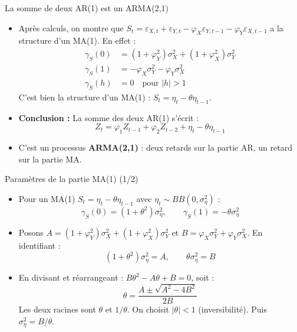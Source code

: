 \documentclass[11pt,aspectratio=169]{beamer}
\begin{document}
\begin{frame}{La somme de deux AR(1) est un ARMA(2,1)}

\begin{itemize}

\item Après calculs, on montre que $S_t = \varepsilon_{X,t} + \varepsilon_{Y,t} - \varphi_X \varepsilon_{Y,t-1} - \varphi_Y \varepsilon_{X,t-1}$ a la structure d'un MA(1). En effet :
  \begin{align*}
  \gamma_S(0) &= (1 + \varphi_Y^2) \sigma_X^2 + (1 + \varphi_X^2) \sigma_Y^2 \\
  \gamma_S(1) &= -\varphi_X \sigma_Y^2 - \varphi_Y \sigma_X^2 \\
  \gamma_S(h) &= 0 \quad \text{pour } |h| > 1
  \end{align*}
  C'est bien la structure d'un MA(1) : $S_t = \eta_t - \theta \eta_{t-1}$.\newline

\item \textbf{Conclusion :} La somme des deux AR(1) s'écrit :
\[
Z_t = \varphi_1 Z_{t-1} + \varphi_2 Z_{t-2} + \eta_t - \theta \eta_{t-1}
\]

\item C'est un processus \textbf{ARMA(2,1)} : deux retards sur la partie AR, un retard sur la partie MA.

\end{itemize}
\end{frame}

\begin{frame}{Paramètres de la partie MA(1) (1/2)}

\begin{itemize}

\item Pour un MA(1) $S_t = \eta_t - \theta \eta_{t-1}$ avec $\eta_t \sim BB(0, \sigma_\eta^2)$ :
  \[
  \gamma_S(0) = (1+\theta^2)\sigma_\eta^2, \qquad \gamma_S(1) = -\theta \sigma_\eta^2
  \]\newline

\item Posons $A = (1+\varphi_Y^2)\sigma_X^2 + (1+\varphi_X^2)\sigma_Y^2$ et $B = \varphi_X \sigma_Y^2 + \varphi_Y \sigma_X^2$. En identifiant :
  \[
  (1+\theta^2)\sigma_\eta^2 = A, \qquad \theta \sigma_\eta^2 = B
  \]\newline

\item En divisant et réarrangeant : $B\theta^2 - A\theta + B = 0$, soit :
  \[
  \theta = \frac{A \pm \sqrt{A^2 - 4B^2}}{2B}
  \]
  Les deux racines sont $\theta$ et $1/\theta$. On choisit $|\theta| < 1$ (inversibilité). Puis $\sigma_\eta^2 = B / \theta$.

\end{itemize}

\end{frame}
\end{document}
